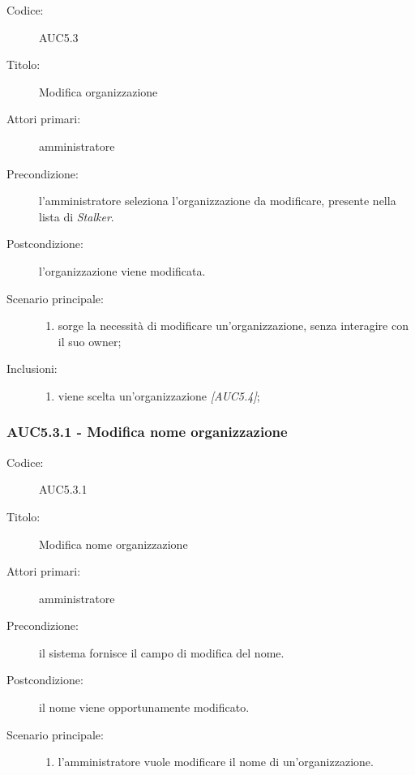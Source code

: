 \documentclass[../../../analisi-dei-requisiti.tex]{subfiles}
\begin{document}
\begin{description}
  \item[Codice:] AUC5.3
  \item[Titolo:] Modifica organizzazione
  \item[Attori primari:] amministratore
  \item[Precondizione:] l'amministratore seleziona l'organizzazione da modificare, presente nella lista di \emph{Stalker}.
  \item[Postcondizione:] l'organizzazione viene modificata.
  \item[Scenario principale:]
  \begin{enumerate}
    \item sorge la necessità di modificare un'organizzazione, senza interagire con il suo owner;
  \end{enumerate}
  \item[Inclusioni:]
  \begin{enumerate}
    \item viene scelta un'organizzazione \emph{[AUC5.4]};
  \end{enumerate}
\end{description}

\subsubsection{AUC5.3.1 - Modifica nome organizzazione}%
\label{subs:AUC5.3.1}
\begin{description}
  \item[Codice:] AUC5.3.1
  \item[Titolo:] Modifica nome organizzazione
  \item[Attori primari:] amministratore
  \item[Precondizione:] il sistema fornisce il campo di modifica del nome.
  \item[Postcondizione:] il nome viene opportunamente modificato.
  \item[Scenario principale:]
  \begin{enumerate}
    \item l'amministratore vuole modificare il nome di un'organizzazione.
  \end{enumerate}
\end{description}
\end{document}
